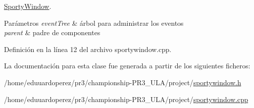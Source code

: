 \hyperlink{class_sporty_window}{Sporty\+Window}. 


\begin{DoxyParams}{Parámetros}
{\em event\+Tree} & árbol para administrar los eventos \\
\hline
{\em parent} & padre de componentes \\
\hline
\end{DoxyParams}


Definición en la línea 12 del archivo sportywindow.\+cpp.



La documentación para esta clase fue generada a partir de los siguientes ficheros\+:\begin{DoxyCompactItemize}
\item 
/home/eduuardoperez/pr3/championship-\/\+P\+R3\+\_\+\+U\+L\+A/project/\hyperlink{sportywindow_8h}{sportywindow.\+h}\item 
/home/eduuardoperez/pr3/championship-\/\+P\+R3\+\_\+\+U\+L\+A/project/\hyperlink{sportywindow_8cpp}{sportywindow.\+cpp}\end{DoxyCompactItemize}
